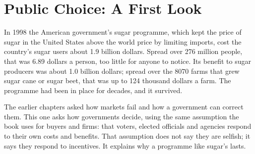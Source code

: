 \chapter{Public Choice: A First Look}\label{ch:g11:public-choice-first-look}

In 1998 the American government's sugar programme, which kept the price of sugar in the United States above the world price by limiting imports, cost the country's
sugar users about 1.9 billion dollars. Spread over 276 million people, that was 6.89 dollars a person, too little for anyone to notice. Its benefit to sugar producers was
about 1.0 billion dollars; spread over the 8070 farms that grew sugar cane or sugar beet, that was up to 124 thousand dollars a farm. The programme had been in place for
decades, and it survived.

The earlier chapters asked how markets fail and how a government can correct them. This one asks how governments decide, using the same assumption the book uses for
buyers and firms: that voters, elected officials and agencies respond to their own costs and benefits. That assumption does not say they are selfish; it says they
respond to incentives. It explains why a programme like sugar's lasts.

